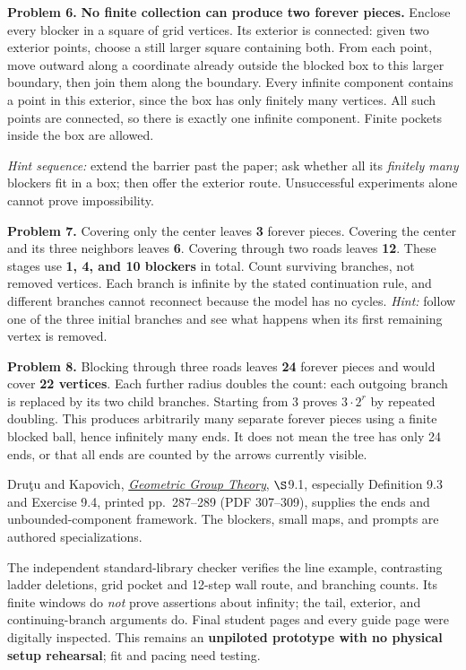 \documentclass[11pt,letterpaper]{article}
\newcommand{\heading}[1]{\par\vspace{5pt}{\large\bfseries #1}\par}
\begin{document}
\textbf{Problem 6.} \textbf{No finite collection can produce two forever pieces.} Enclose every blocker in a square of grid vertices. Its exterior is connected: given two exterior points, choose a still larger square containing both. From each point, move outward along a coordinate already outside the blocked box to this larger boundary, then join them along the boundary. Every infinite component contains a point in this exterior, since the box has only finitely many vertices. All such points are connected, so there is exactly one infinite component. Finite pockets inside the box are allowed.

\emph{Hint sequence:} extend the barrier past the paper; ask whether all its \emph{finitely many} blockers fit in a box; then offer the exterior route. Unsuccessful experiments alone cannot prove impossibility.

\textbf{Problem 7.} Covering only the center leaves \textbf{3} forever pieces. Covering the center and its three neighbors leaves \textbf{6}. Covering through two roads leaves \textbf{12}. These stages use \textbf{1, 4, and 10 blockers} in total. Count surviving branches, not removed vertices. Each branch is infinite by the stated continuation rule, and different branches cannot reconnect because the model has no cycles. \emph{Hint:} follow one of the three initial branches and see what happens when its first remaining vertex is removed.

\textbf{Problem 8.} Blocking through three roads leaves \textbf{24} forever pieces and would cover \textbf{22 vertices}. Each further radius doubles the count: each outgoing branch is replaced by its two child branches. Starting from 3 proves $3\cdot2^r$ by repeated doubling. This produces arbitrarily many separate forever pieces using a finite blocked ball, hence infinitely many ends. It does not mean the tree has only 24 ends, or that all ends are counted by the arrows currently visible.

\heading{Sources and checking limits}
Dru\c{t}u and Kapovich, \href{https://www.math.ucdavis.edu/~kapovich/EPR/ggt.pdf}{\emph{Geometric Group Theory}}, $\S$9.1, especially Definition 9.3 and Exercise 9.4, printed pp.\ 287--289 (PDF 307--309), supplies the ends and unbounded-component framework. The blockers, small maps, and prompts are authored specializations.

The independent standard-library checker verifies the line example, contrasting ladder deletions, grid pocket and 12-step wall route, and branching counts. Its finite windows do \emph{not} prove assertions about infinity; the tail, exterior, and continuing-branch arguments do. Final student pages and every guide page were digitally inspected. This remains an \textbf{unpiloted prototype with no physical setup rehearsal}; fit and pacing need testing.
\end{document}
